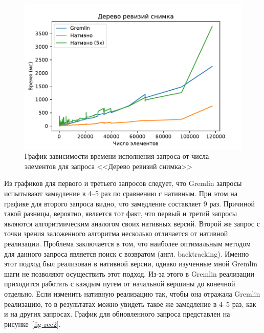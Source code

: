 \documentclass[times,specification,annotation]{itmo-student-thesis}
\begin{document}
\begin{figure}[!h]
\caption{График зависимости времени исполнения запроса от числа элементов для запроса <<Дерево ревизий снимка>>}\label{fig-snp}
\centering
\includegraphics{img/snp-plot.pdf}
\end{figure}

Из графиков для первого и третьего запросов следует, что Gremlin запросы испытывают замедление в 4--5 раз по сравнению с нативным.
При этом на графике для второго запроса видно, что замедление составляет 9 раз. Причиной такой разницы, вероятно, является тот факт, что первый и третий запросы являются алгоритмическим аналогом своих нативных версий. Второй же запрос с точки зрения заложенного алгоритма несколько отличается от нативной реализации. Проблема заключается в том, что наиболее оптимальным методом для данного запроса является поиск с возвратом (англ. backtracking). Именно этот подход был реализован в нативной версии, однако изученные мной Gremlin шаги не позволяют осуществить этот подход. Из-за этого в Gremlin реализации приходится работать с каждым путем от начальной вершины до конечной отдельно. Если изменить нативную реализацию так, чтобы она отражала Gremlin реализацию, то в результатах можно увидеть такое же замедление в 4--5 раз, как и на других запросах. График для обновленного запроса представлен на рисунке~\ref{fig-rec2}.
\end{document}
